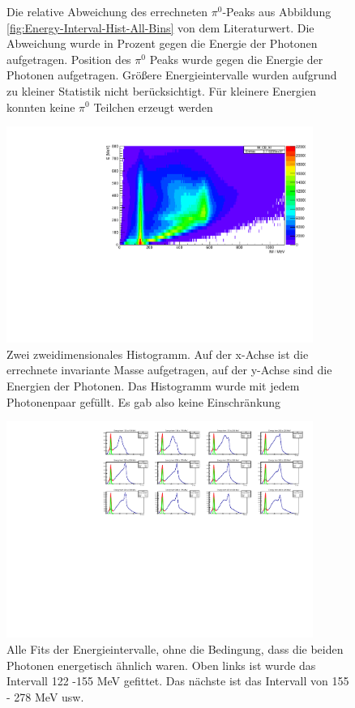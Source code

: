 \documentclass[a4paper,11pt,oneside,final,german,openbib,pdftex]{scrbook}
\begin{document}
\begin{appendix}
\begin{figure}[h!]
\begin{center}
		\caption{Die relative Abweichung des errechneten $\pi^0$-Peaks aus Abbildung \ref{fig:Energy-Interval-Hist-All-Bins} von dem Literaturwert. Die Abweichung wurde in Prozent gegen die Energie der Photonen aufgetragen.  Position des $\pi^0$ Peaks wurde gegen die Energie der Photonen aufgetragen. Gr\"o{\ss}ere Energieintervalle wurden aufgrund zu kleiner Statistik nicht ber\"ucksichtigt. F\"ur kleinere Energien konnten keine $\pi^0$ Teilchen erzeugt werden}			
		\label{fig:RelativEnergyDependency}	

	\end{center}
\end{figure}

\begin{figure}[h!]
	\begin{center}
		\includegraphics[width=100mm]{RealDataEnergyIntervalAllPhotonsHist}
		\caption{Zwei zweidimensionales Histogramm. Auf der x-Achse ist die errechnete invariante Masse aufgetragen, auf der y-Achse sind die Energien der Photonen. Das Histogramm wurde mit jedem Photonenpaar gefüllt. Es gab also keine Einschränkung }
		\label{fig:Energy-Intervall-Hist-All-Energys-No-Condition}
	\end{center}
\end{figure}


\begin{figure}[h!]
	\begin{center}
		\includegraphics[width=100mm]{RealDataEnergyIntervalAllPhotonsAllFits}
		\caption{Alle Fits der Energieintervalle, ohne die Bedingung, dass die beiden Photonen energetisch ähnlich waren. Oben links ist wurde das Intervall 122 -155 MeV gefittet. Das nächste ist das Intervall von 155 - 278 MeV usw.}
		\label{fig:allenergyallfits}
	\end{center}
\end{figure}


\end{appendix}
\end{document}
